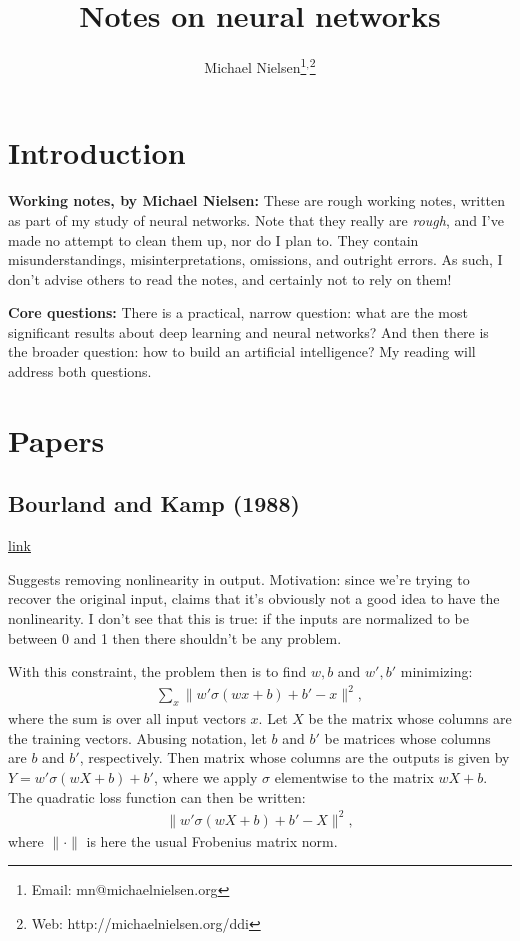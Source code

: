 \documentclass[12pt]{report}
\newcommand{\link}[2]{\href{#1}{#2}}
\begin{document}
\title{Notes on neural networks}
\author{Michael Nielsen\thanks{Email: mn@michaelnielsen.org}$^{,}$\thanks{Web: http://michaelnielsen.org/ddi}}

\maketitle

\chapter{Introduction}

\textbf{Working notes, by Michael Nielsen:} These are rough working
notes, written as part of my study of neural networks.  Note that they
really are \emph{rough}, and I've made no attempt to clean them up,
nor do I plan to.  They contain misunderstandings, misinterpretations,
omissions, and outright errors.  As such, I don't advise others to
read the notes, and certainly not to rely on them!

\textbf{Core questions:} There is a practical, narrow question: what
are the most significant results about deep learning and neural
networks?  And then there is the broader question: how to build an
artificial intelligence?  My reading will address both questions.

\chapter{Papers}

\section{Bourland and Kamp (1988)}

\link{http://scholar.google.com/scholar?cluster=17784424506773259343\&hl=en\&as\_sdt=0,5}{link}

Suggests removing nonlinearity in output.  Motivation: since we're
trying to recover the original input, claims that it's obviously not a
good idea to have the nonlinearity.  I don't see that this is true: if
the inputs are normalized to be between 0 and 1 then there shouldn't
be any problem.

With this constraint, the problem then is to find $w, b$ and $w', b'$
minimizing:
\begin{eqnarray}
  \sum_x \|w' \sigma(wx+b)+b'-x\|^2,
\end{eqnarray}
where the sum is over all input vectors $x$.  Let $X$ be the matrix
whose columns are the training vectors.  Abusing notation, let $b$ and
$b'$ be matrices whose columns are $b$ and $b'$, respectively.  Then
matrix whose columns are the outputs is given by $Y =
w'\sigma(wX+b)+b'$, where we apply $\sigma$ elementwise to the
matrix $wX+b$.  The quadratic loss function can then be written:
\begin{eqnarray}
  \| w'\sigma(wX+b)+b'-X\|^2,
\end{eqnarray}
where $\|\cdot\|$ is here the usual Frobenius matrix norm.
\end{document}
